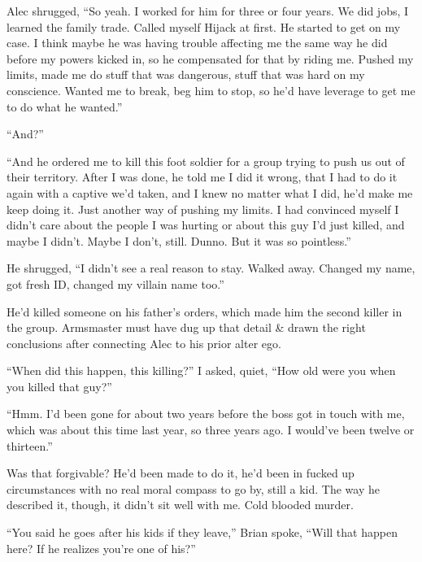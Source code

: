 Alec shrugged, ``So yeah.  I worked for him for three or four years.  We did jobs, I learned the family trade.  Called myself Hijack at first.  He started to get on my case.  I think maybe he was having trouble affecting me the same way he did before my powers kicked in, so he compensated for that by riding me.  Pushed my limits, made me do stuff that was dangerous, stuff that was hard on my conscience.  Wanted me to break, beg him to stop, so he'd have leverage to get me to do what he wanted.''



``And?''



``And he ordered me to kill this foot soldier for a group trying to push us out of their territory.  After I was done, he told me I did it wrong, that I had to do it again with a captive we'd taken, and I knew no matter what I did, he'd make me keep doing it.  Just another way of pushing my limits.  I had convinced myself I didn't care about the people I was hurting or about this guy I'd just killed, and maybe I didn't.  Maybe I don't, still.  Dunno.  But it was so pointless.''



He shrugged, ``I didn't see a real reason to stay.  Walked away.  Changed my name, got fresh ID, changed my villain name too.''



He'd killed someone on his father's orders, which made him the second killer in the group. Armsmaster must have dug up that detail & drawn the right conclusions after connecting Alec to his prior alter ego.



``When did this happen, this killing?'' I asked, quiet, ``How old were you when you killed that guy?''



``Hmm.  I'd been gone for about two years before the boss got in touch with me, which was about this time last year, so three years ago.  I would've been twelve or thirteen.''



Was that forgivable?  He'd been made to do it, he'd been in fucked up circumstances with no real moral compass to go by, still a kid.  The way he described it, though, it didn't sit well with me.  Cold blooded murder.



``You said he goes after his kids if they leave,'' Brian spoke, ``Will that happen here?  If he realizes you're one of his?''



